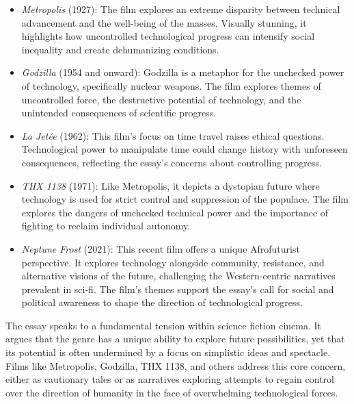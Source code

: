 \documentclass[11pt,fleqn]{book} %
\begin{document}
\begin{itemize}
\item \textit{Metropolis} (1927): The film explores an extreme disparity between technical advancement and the well-being of the masses. Visually stunning, it highlights how uncontrolled technological progress can intensify social inequality and create dehumanizing conditions. 

\item \textit{Godzilla} (1954 and onward): Godzilla is a metaphor for the unchecked power of technology, specifically nuclear weapons. The film explores themes of uncontrolled force, the destructive potential of technology, and the unintended consequences of scientific progress. 

\item \textit{La Jetée} (1962): This film's focus on time travel raises ethical questions. Technological power to manipulate time could change history with unforeseen consequences, reflecting the essay's concerns about controlling progress.

\item \textit{THX 1138} (1971):  Like Metropolis, it depicts a dystopian future where technology is used for strict control and suppression of the populace. The film explores the dangers of unchecked technical power and the importance of fighting to reclaim individual autonomy. 

\item \textit{Neptune Frost} (2021): This recent film offers a unique Afrofuturist perspective. It explores technology alongside community, resistance, and alternative visions of the future, challenging the Western-centric narratives prevalent in sci-fi. The film's themes support the essay's call for social and political awareness to shape the direction of technological progress.
\end{itemize}

\vspace{5pt}
The essay speaks to a fundamental tension within science fiction cinema. It argues that the genre has a unique ability to explore future possibilities, yet that its potential is often undermined by a focus on simplistic ideas and spectacle. Films like Metropolis, Godzilla, THX 1138, and others address this core concern, either as cautionary tales or as narratives exploring attempts to regain control over the direction of humanity in the face of overwhelming technological forces. 
\end{document}
